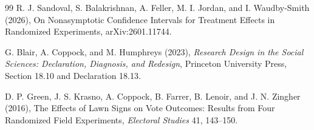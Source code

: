 \documentclass{article}
\begin{document}
\begin{thebibliography}{99}
   R. J. Sandoval, S. Balakrishnan, A. Feller, M. I. Jordan, and I. Waudby-Smith (2026), On Nonasymptotic Confidence Intervals for Treatment Effects in Randomized Experiments, arXiv:2601.11744.

   G. Blair, A. Coppock, and M. Humphreys (2023), \emph{Research Design in the Social Sciences: Declaration, Diagnosis, and Redesign}, Princeton University Press, Section 18.10 and Declaration 18.13.

   D. P. Green, J. S. Krasno, A. Coppock, B. Farrer, B. Lenoir, and J. N. Zingher (2016), The Effects of Lawn Signs on Vote Outcomes: Results from Four Randomized Field Experiments, \emph{Electoral Studies} 41, 143--150.

\end{thebibliography}
\end{document}
